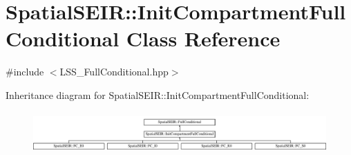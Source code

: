 \hypertarget{classSpatialSEIR_1_1InitCompartmentFullConditional}{\section{Spatial\-S\-E\-I\-R\-:\-:Init\-Compartment\-Full\-Conditional Class Reference}
\label{classSpatialSEIR_1_1InitCompartmentFullConditional}
}


{\ttfamily \#include $<$L\-S\-S\-\_\-\-Full\-Conditional.\-hpp$>$}

Inheritance diagram for Spatial\-S\-E\-I\-R\-:\-:Init\-Compartment\-Full\-Conditional\-:\begin{figure}[H]
\begin{center}
\leavevmode
\includegraphics[height=1.590909cm]{classSpatialSEIR_1_1InitCompartmentFullConditional}
\end{center}
\end{figure}

